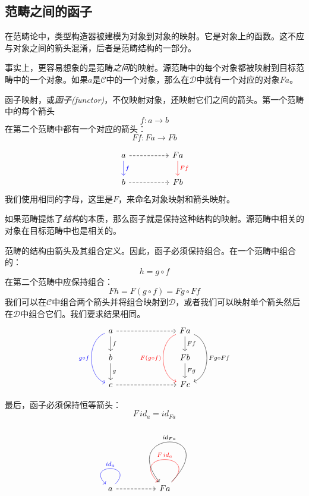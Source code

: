 \documentclass[DaoFP]{subfiles}
\begin{document}
\subsection{范畴之间的函子}

在范畴论中，类型构造器被建模为对象到对象的映射。它是对象上的函数。这不应与对象之间的箭头混淆，后者是范畴结构的一部分。

事实上，更容易想象的是范畴\emph{之间}的映射。源范畴中的每个对象都被映射到目标范畴中的一个对象。如果$a$是$\mathcal{C}$中的一个对象，那么在$\mathcal{D}$中就有一个对应的对象$F a$。

函子映射，或\emph{函子(functor)}，不仅映射对象，还映射它们之间的箭头。第一个范畴中的每个箭头
\[ f \colon a \to b\]
在第二个范畴中都有一个对应的箭头：
\[ F f \colon F a \to F b\]

\[
 \begin{tikzcd}
 a 
 \arrow[d, blue, "f"]
\arrow[rr, dashed]
 && F a
  \arrow[d, red, "F f"]
 \\
 b 
 \arrow[rr, dashed]
&& F b
  \end{tikzcd}
\]
我们使用相同的字母，这里是$F$，来命名对象映射和箭头映射。

如果范畴提炼了\emph{结构}的本质，那么函子就是保持这种结构的映射。源范畴中相关的对象在目标范畴中也是相关的。

范畴的结构由箭头及其组合定义。因此，函子必须保持组合。在一个范畴中组合的：
\[ h = g \circ f \]
在第二个范畴中应保持组合：
\[ F h = F (g \circ f) = F g \circ F f \]
我们可以在$\mathcal{C}$中组合两个箭头并将组合映射到$\mathcal{D}$，或者我们可以映射单个箭头然后在$\mathcal{D}$中组合它们。我们要求结果相同。
\[
 \begin{tikzcd}
 a 
 \arrow[d, "f"]
\arrow[rrr, dashed]
\arrow[dd, bend right = 70, blue, "g \circ f"']
 &&& F a
  \arrow[d, "F f"]
  \arrow[dd, bend left = 70, "F g \circ F f"]
  \arrow[dd, bend right = 70, red, "F (g \circ f)"']
 \\
 b 
 \arrow[d, "g"]
&&& F b
 \arrow[d, "F g"]
 \\
 c
 \arrow[rrr, dashed]
&&& F c
  \end{tikzcd}
\]

最后，函子必须保持恒等箭头：
\[ F\, id_a = id_{F a} \]

\[
 \begin{tikzcd}
 a 
  \arrow[loop, blue,  "id_a"']
\arrow[rr, dashed]
 && F a
  \arrow[loop, red, "F \, id_{a}"']
  \arrow[loop, controls={+(2.5, 2.6) and +(-2, 2.5)}, "id_{F a}"']
  \end{tikzcd}
\]
\end{document}
